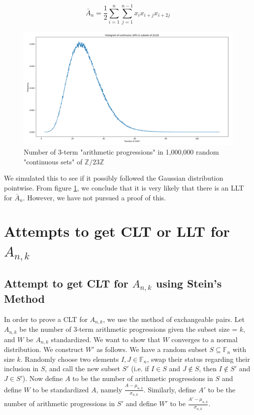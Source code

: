 \documentclass[12pt]{article} %
\newcommand{\F}{\mathbb{F}}
\newcommand{\Z}{\mathbb{Z}}
\theoremstyle{definition}
\theoremstyle{remark}
\begin{document}
$$ \bar{A}_n = \frac{1}{2}\sum_{i = 1}^{n} {\sum_{j = 1}^{n-1} {x_i x_{i+j} x_{i+2j}}} $$

\begin{figure}[h]
	\centering
    \includegraphics[scale=0.75]{3ap-cont}
    \caption{Number of 3-term "arithmetic progressions" in 1,000,000 random "continuous sets" of $\Z / 23\Z$}
    \label{fig:3ap-cont}
\end{figure}

We simulated this to see if it possibly followed the Gaussian distribution pointwise. From figure \ref{fig:3ap-cont}, we conclude that it is very likely that there is an LLT for $\bar{A}_n$. However, we have not pursued a proof of this.

\section{Attempts to get CLT or LLT for $A_{n,k}$}

\subsection*{Attempt to get CLT for $A_{n,k}$ using Stein's Method} 

In order to prove a CLT for $A_{n,k}$, we use the method of exchangeable pairs. Let $A_{n,k}$ be the number of 3-term arithmetic progressions given the subset size = $k$, and $W$ be $A_{n,k}$ standardized. We want to show that $W$ converges to a normal distribution. 
We construct $W'$ as follows. We have a random subset $S \subseteq \F_n$ with size $k$. Randomly choose two elements $I,J \in \F_n$, swap their status regarding their inclusion in $S$, and call the new subset $S'$ (i.e. if $I \in S$ and $J \not \in S$, then $I \not \in S'$ and $J \in S'$). Now define $A$ to be the number of arithmetic progressions in $S$ and define $W$ to be standardized $A$, namely $\frac{A-\mu_{n,k}}{\sigma_{n,k}}$. Similarly, define $A'$ to be the number of arithmetic progressions in $S'$ and define $W'$ to be $\frac{A'-\mu_{n,k}}{\sigma_{n,k}}$.
\end{document}
